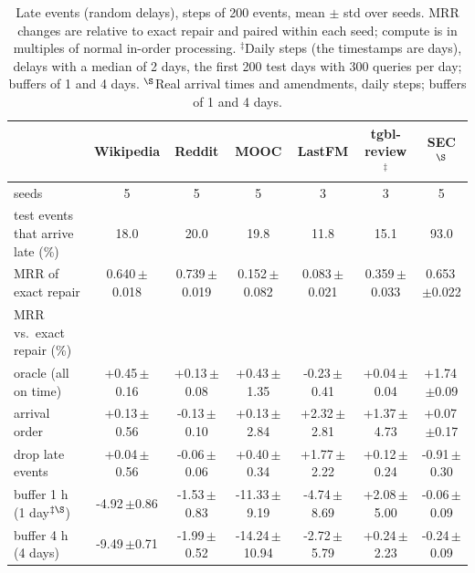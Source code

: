 \begin{table}[t]
\centering\scriptsize
\caption{Late events (random delays), steps of 200 events, mean $\pm$ std over seeds. MRR changes are relative to exact repair
and paired within each seed; compute is in multiples of normal in-order processing. $^\ddagger$Daily steps (the timestamps
are days), delays with a median of 2 days, the first 200 test days with 300 queries per day; buffers of 1 and 4 days.
$^\S$Real arrival times and amendments, daily steps; buffers of 1 and 4 days.}
\label{tab:late}
\setlength{\tabcolsep}{3pt}
\begin{tabular}{@{}lcccccc@{}}
\toprule
 & Wikipedia & Reddit & MOOC & LastFM & tgbl-review$^\ddagger$ & SEC$^\S$ \\
\midrule
seeds & 5 & 5 & 5 & 3 & 3 & 5 \\
test events that arrive late (\%) & 18.0 & 20.0 & 19.8 & 11.8 & 15.1 & 93.0 \\
MRR of exact repair & 0.640\,{\scriptsize$\pm$0.018} & 0.739\,{\scriptsize$\pm$0.019} & 0.152\,{\scriptsize$\pm$0.082} & 0.083\,{\scriptsize$\pm$0.021} & 0.359\,{\scriptsize$\pm$0.033} & 0.653\,{\scriptsize$\pm$0.022} \\
\midrule
MRR vs.\ exact repair (\%) &  &  &  &  &  &  \\
\quad oracle (all on time) & +0.45\,{\scriptsize$\pm$0.16} & +0.13\,{\scriptsize$\pm$0.08} & +0.43\,{\scriptsize$\pm$1.35} & -0.23\,{\scriptsize$\pm$0.41} & +0.04\,{\scriptsize$\pm$0.04} & +1.74\,{\scriptsize$\pm$0.09} \\
\quad arrival order & +0.13\,{\scriptsize$\pm$0.56} & -0.13\,{\scriptsize$\pm$0.10} & +0.13\,{\scriptsize$\pm$2.84} & +2.32\,{\scriptsize$\pm$2.81} & +1.37\,{\scriptsize$\pm$4.73} & +0.07\,{\scriptsize$\pm$0.17} \\
\quad drop late events & +0.04\,{\scriptsize$\pm$0.56} & -0.06\,{\scriptsize$\pm$0.06} & +0.40\,{\scriptsize$\pm$0.34} & +1.77\,{\scriptsize$\pm$2.22} & +0.12\,{\scriptsize$\pm$0.24} & -0.91\,{\scriptsize$\pm$0.30} \\
\quad buffer 1 h (1 day$^{\ddagger\S}$) & -4.92\,{\scriptsize$\pm$0.86} & -1.53\,{\scriptsize$\pm$0.83} & -11.33\,{\scriptsize$\pm$9.19} & -4.74\,{\scriptsize$\pm$8.69} & +2.08\,{\scriptsize$\pm$5.00} & -0.06\,{\scriptsize$\pm$0.09} \\
\quad buffer 4 h (4 days) & -9.49\,{\scriptsize$\pm$0.71} & -1.99\,{\scriptsize$\pm$0.52} & -14.24\,{\scriptsize$\pm$10.94} & -2.72\,{\scriptsize$\pm$5.79} & +0.24\,{\scriptsize$\pm$2.23} & -0.24\,{\scriptsize$\pm$0.09} \\

\end{tabular}
\end{table}
